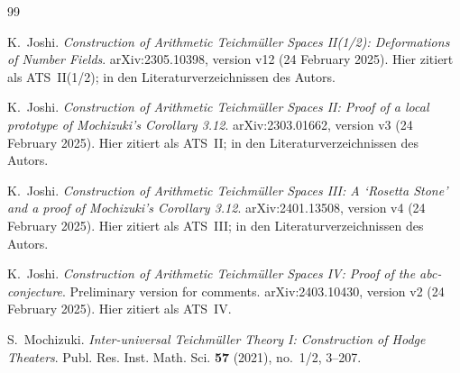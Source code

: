 \documentclass[11pt,a4paper]{article}
\theoremstyle{definition}
\theoremstyle{plain}
\theoremstyle{definition}
\begin{document}
\begin{thebibliography}{99}
\small

K.~Joshi.
\newblock \emph{Construction of Arithmetic Teichmüller Spaces II(1/2):
Deformations of Number Fields}.
\newblock arXiv:2305.10398, version v12 (24 February 2025). Hier zitiert als
ATS~II(1/2); \glqq [Joshi, 2023a]\grqq{} in den Literaturverzeichnissen des Autors.

K.~Joshi.
\newblock \emph{Construction of Arithmetic Teichmüller Spaces II: Proof of a
local prototype of Mochizuki's Corollary 3.12}.
\newblock arXiv:2303.01662, version v3 (24 February 2025). Hier zitiert als
ATS~II; \glqq [Joshi, 2023b]\grqq{} in den Literaturverzeichnissen des Autors.

K.~Joshi.
\newblock \emph{Construction of Arithmetic Teichmüller Spaces III: A `Rosetta
Stone' and a proof of Mochizuki's Corollary 3.12}.
\newblock arXiv:2401.13508, version v4 (24 February 2025). Hier zitiert als
ATS~III; \glqq [Joshi, 2024c]\grqq{} in den Literaturverzeichnissen des Autors.

K.~Joshi.
\newblock \emph{Construction of Arithmetic Teichmüller Spaces IV: Proof of the
abc-conjecture}. Preliminary version for comments.
\newblock arXiv:2403.10430, version v2 (24 February 2025). Hier zitiert als ATS~IV.

S.~Mochizuki.
\newblock \emph{Inter-universal Teichmüller Theory I: Construction of Hodge
Theaters}.
\newblock Publ. Res. Inst. Math. Sci. \textbf{57} (2021), no.~1/2, 3--207.


\end{thebibliography}
\end{document}
